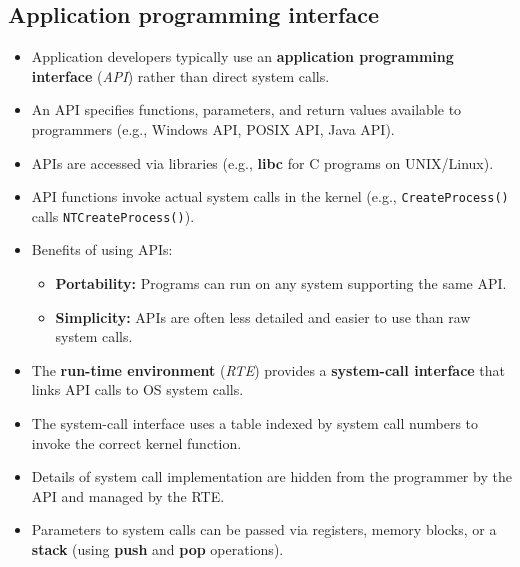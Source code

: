 \subsection*{Application programming interface}
\begin{itemize}
    \item Application developers typically use an \textbf{application programming interface} (\textit{API}) rather than direct system calls.
    \item An API specifies functions, parameters, and return values available to programmers (e.g., Windows API, POSIX API, Java API).
    \item APIs are accessed via libraries (e.g., \textbf{libc} for C programs on UNIX/Linux).
    \item API functions invoke actual system calls in the kernel (e.g., \texttt{CreateProcess()} calls \texttt{NTCreateProcess()}).
    \item Benefits of using APIs:
    \begin{itemize}
        \item \textbf{Portability:} Programs can run on any system supporting the same API.
        \item \textbf{Simplicity:} APIs are often less detailed and easier to use than raw system calls.
    \end{itemize}
    \item The \textbf{run-time environment} (\textit{RTE}) provides a \textbf{system-call interface} that links API calls to OS system calls.
    \item The system-call interface uses a table indexed by system call numbers to invoke the correct kernel function.
    \item Details of system call implementation are hidden from the programmer by the API and managed by the RTE.
    \item Parameters to system calls can be passed via registers, memory blocks, or a \textbf{stack} (using \textbf{push} and \textbf{pop} operations).
\end{itemize}

